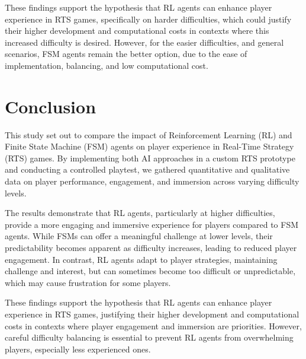 \documentclass[conference]{IEEEtran}
\begin{document}
These findings support the hypothesis that RL agents can enhance player experience in RTS games, specifically on harder difficulties, which could justify their higher development and computational costs in contexts
where this increased difficulty is desired. However, for the easier difficulties, and general scenarios, FSM agents remain the better option, due to the ease of implementation, balancing, and low computational cost.


\section{Conclusion}

This study set out to compare the impact of Reinforcement Learning (RL) and Finite State Machine (FSM) agents on player experience in Real-Time Strategy (RTS) games.
By implementing both AI approaches in a custom RTS prototype and conducting a controlled playtest, we gathered quantitative and qualitative data on player performance, engagement,
and immersion across varying difficulty levels.

The results demonstrate that RL agents, particularly at higher difficulties, provide a more engaging and immersive experience for players compared to FSM agents.
While FSMs can offer a meaningful challenge at lower levels, their predictability becomes apparent as difficulty increases, leading to reduced player engagement. In contrast, RL agents adapt to player strategies, maintaining challenge and interest, but can sometimes become too difficult or unpredictable, which may cause frustration for some players.

These findings support the hypothesis that RL agents can enhance player experience in RTS games, justifying their higher development and computational costs in contexts where player engagement and
immersion are priorities. However, careful difficulty balancing is essential to prevent RL agents from overwhelming players, especially less experienced ones.



\end{document}

